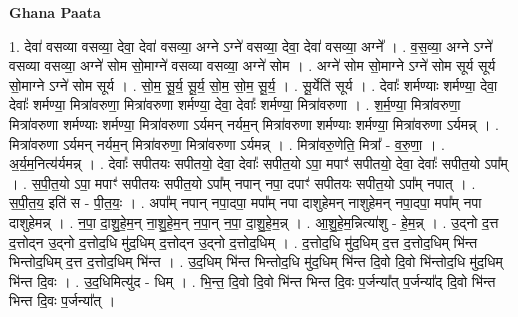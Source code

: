 \documentclass[17pt]{extarticle}
\begin{document}
\textbf{Ghana Paata } \newline

1. देवा॑ वसव्या वसव्या॒ देवा॒ देवा॑ वसव्या॒ अग्ने ऽग्ने॑ वसव्या॒ देवा॒ देवा॑ वसव्या॒ अग्ने᳚ । . व॒स॒व्या॒ अग्ने ऽग्ने॑ वसव्या वसव्या॒ अग्ने॑ सोम सो॒माग्ने॑ वसव्या वसव्या॒ अग्ने॑ सोम । . अग्ने॑ सोम सो॒माग्ने ऽग्ने॑ सोम सूर्य सूर्य सो॒माग्ने ऽग्ने॑ सोम सूर्य । . सो॒म॒ सू॒र्य॒ सू॒र्य॒ सो॒म॒ सो॒म॒ सू॒र्य॒ । . सू॒र्येति॑ सूर्य । . देवाः᳚ शर्मण्याः शर्मण्या॒ देवा॒ देवाः᳚ शर्मण्या॒ मित्रा॑वरुणा॒ मित्रा॑वरुणा शर्मण्या॒ देवा॒ देवाः᳚ शर्मण्या॒ मित्रा॑वरुणा । . श॒र्म॒ण्या॒ मित्रा॑वरुणा॒ मित्रा॑वरुणा शर्मण्याः शर्मण्या॒ मित्रा॑वरुणा ऽर्यमन् नर्यम॒न् मित्रा॑वरुणा शर्मण्याः शर्मण्या॒ मित्रा॑वरुणा ऽर्यमन्न् । . मित्रा॑वरुणा ऽर्यमन् नर्यम॒न् मित्रा॑वरुणा॒ मित्रा॑वरुणा ऽर्यमन्न् । . मित्रा॑वरु॒णेति॒ मित्रा᳚ - व॒रु॒णा॒ । . अ॒र्य॒म॒नित्य॑र्यमन्न् । . देवाः᳚ सपीतयः सपीतयो॒ देवा॒ देवाः᳚ सपीत॒यो ऽपा॒ मपाꣳ॑ सपीतयो॒ देवा॒ देवाः᳚ सपीत॒यो ऽपा᳚म् । . स॒पी॒त॒यो ऽपा॒ मपाꣳ॑ सपीतयः सपीत॒यो ऽपा᳚म् नपान् नपा॒ दपाꣳ॑ सपीतयः सपीत॒यो ऽपा᳚म् नपात् । . स॒पी॒त॒य॒ इति॑ स - पी॒त॒यः॒ । . अपा᳚म् नपान् नपा॒दपा॒ मपा᳚म् नपा दाशुहेमन् नाशुहेमन् नपा॒दपा॒ मपा᳚म् नपा दाशुहेमन्न् । . न॒पा॒ दा॒शु॒हे॒म॒न् ना॒शु॒हे॒म॒न् न॒पा॒न् न॒पा॒ दा॒शु॒हे॒म॒न्न् । . आ॒शु॒हे॒म॒न्नित्या॑शु - हे॒म॒न्न् । . उ॒द्नो द॒त्त द॒त्तोद्न उ॒द्नो द॒त्तोद॒धि मु॑द॒धिम् द॒त्तोद्न उ॒द्नो द॒त्तोद॒धिम् । . द॒त्तोद॒धि मु॑द॒धिम् द॒त्त द॒त्तोद॒धिम् भि॑न्त भिन्तोद॒धिम् द॒त्त द॒त्तोद॒धिम् भि॑न्त । . उ॒द॒धिम् भि॑न्त भिन्तोद॒धि मु॑द॒धिम् भि॑न्त दि॒वो दि॒वो भि॑न्तोद॒धि मु॑द॒धिम् भि॑न्त दि॒वः । . उ॒द॒धिमित्यु॑द - धिम् । . भि॒न्त॒ दि॒वो दि॒वो भि॑न्त भिन्त दि॒वः प॒र्जन्या᳚त् प॒र्जन्या᳚द् दि॒वो भि॑न्त भिन्त दि॒वः प॒र्जन्या᳚त् । \newline
\end{document}
